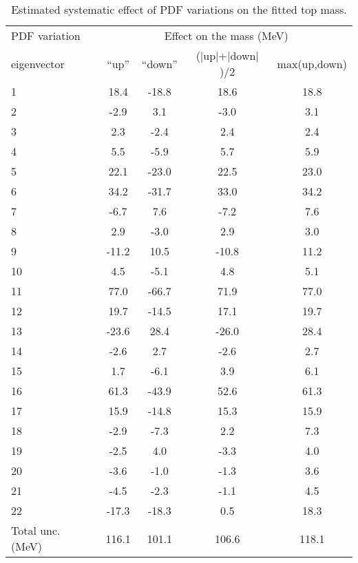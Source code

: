 \begin{table}[tb]
  \begin{center}
    \caption{Estimated systematic effect of PDF variations on the fitted top mass.\label{tab:pdfs}}
    \medskip
    \begin{tabular}{l|cccc}
      \hline\hline
      PDF variation              & \multicolumn{4}{c}{Effect on the mass (MeV) } \\ 
      \cline{2-5}
       eigenvector & ``up'' & ``down'' & ($|$up$|$+$|$down$|$)/2 & max(up,down) \\
      \hline\hline
		1 & 18.4 & -18.8 & 18.6 & 18.8 \\
		2 & -2.9 & 3.1 & -3.0 & 3.1 \\ 
		3 & 2.3 & -2.4 & 2.4 & 2.4 \\ 
		4 & 5.5 & -5.9 & 5.7 & 5.9 \\ 
		5 & 22.1 & -23.0 & 22.5 & 23.0 \\ 
		6 & 34.2 & -31.7 & 33.0 & 34.2 \\ 
		7 & -6.7 & 7.6 & -7.2 & 7.6 \\ 
		8 & 2.9 & -3.0 & 2.9 & 3.0 \\ 
		9 & -11.2 & 10.5 & -10.8 & 11.2 \\ 
		10 & 4.5 & -5.1 & 4.8 & 5.1 \\ 
		11 & 77.0 & -66.7 & 71.9 & 77.0 \\ 
		12 & 19.7 & -14.5 & 17.1 & 19.7 \\ 
		13 & -23.6 & 28.4 & -26.0 & 28.4 \\ 
		14 & -2.6 & 2.7 & -2.6 & 2.7 \\ 
		15 & 1.7 & -6.1 & 3.9 & 6.1 \\ 
		16 & 61.3 & -43.9 & 52.6 & 61.3 \\ 
		17 & 15.9 & -14.8 & 15.3 & 15.9 \\ 
		18 & -2.9 & -7.3 & 2.2 & 7.3 \\ 
		19 & -2.5 & 4.0 & -3.3 & 4.0 \\ 
		20 & -3.6 & -1.0 & -1.3 & 3.6 \\ 
		21 & -4.5 & -2.3 & -1.1 & 4.5 \\ 
		22 & -17.3 & -18.3 & 0.5 & 18.3 \\ 
      \hline
      \hline
      Total unc. (MeV)  & 116.1 & 101.1 & 106.6 & 118.1 \\
      \hline\hline
    \end{tabular}
  \end{center}
\end{table}  